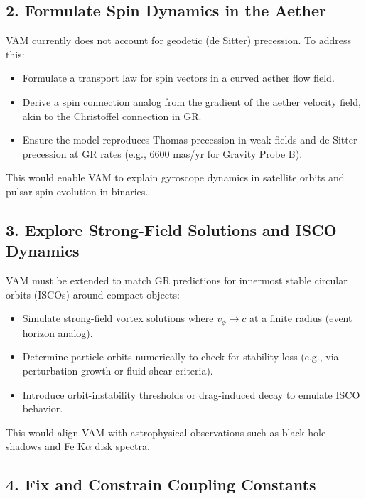 \subsection*{2. Formulate Spin Dynamics in the Aether}

VAM currently does not account for geodetic (de Sitter) precession. To address this:

\begin{itemize}
    \item Formulate a transport law for spin vectors in a curved aether flow field.
    \item Derive a spin connection analog from the gradient of the aether velocity field, akin to the Christoffel connection in GR.
    \item Ensure the model reproduces Thomas precession in weak fields and de Sitter precession at GR rates (e.g., $6600$ mas/yr for Gravity Probe B).
\end{itemize}

This would enable VAM to explain gyroscope dynamics in satellite orbits and pulsar spin evolution in binaries.

\subsection*{3. Explore Strong-Field Solutions and ISCO Dynamics}

VAM must be extended to match GR predictions for innermost stable circular orbits (ISCOs) around compact objects:

\begin{itemize}
    \item Simulate strong-field vortex solutions where $v_\phi \rightarrow c$ at a finite radius (event horizon analog).
    \item Determine particle orbits numerically to check for stability loss (e.g., via perturbation growth or fluid shear criteria).
    \item Introduce orbit-instability thresholds or drag-induced decay to emulate ISCO behavior.
\end{itemize}

This would align VAM with astrophysical observations such as black hole shadows and Fe K$\alpha$ disk spectra.

\subsection*{4. Fix and Constrain Coupling Constants}

